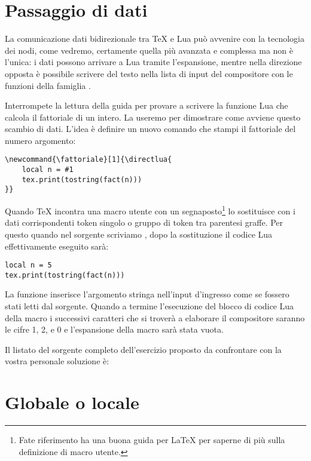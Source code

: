 \section{Passaggio di dati}
\label{secPassaggioDati}

La comunicazione dati bidirezionale tra \TeX{} e Lua può avvenire con la
tecnologia dei nodi, come vedremo, certamente quella più avanzata e complessa
ma non è l'unica: i dati possono arrivare a Lua tramite l'espansione, mentre
nella direzione opposta è possibile scrivere del testo nella lista di input
del compositore con le funzioni della famiglia .

Interrompete la lettura della guida per provare a scrivere la funzione Lua
 che calcola il fattoriale di un intero. La useremo per dimostrare come
avviene questo scambio di dati. L'idea è definire un nuovo comando che stampi il
fattoriale del numero argomento:
\begin{Verbatim}
\newcommand{\fattoriale}[1]{\directlua{
    local n = #1
    tex.print(tostring(fact(n)))
}}
\end{Verbatim}

Quando \TeX{} incontra una macro utente con un segnaposto\footnote{Fate
riferimento ha una buona guida per \LaTeX{} per saperne di più sulla definizione
di macro utente.} lo sostituisce con i dati corrispondenti token singolo o
gruppo di token tra parentesi graffe. Per questo quando nel sorgente scriviamo
, dopo la sostituzione il codice Lua effettivamente
eseguito sarà:
\begin{Verbatim}
local n = 5
tex.print(tostring(fact(n)))
\end{Verbatim}

La funzione  inserisce l'argomento stringa nell'input d'ingresso
come se fossero stati letti dal sorgente. Quando a termine l'esecuzione del
blocco di codice Lua della macro  i successivi caratteri che si
troverà a elaborare il compositore saranno le cifre 1, 2, e 0 e l'espansione
della macro sarà stata vuota.

Il listato del sorgente completo dell'esercizio proposto da confrontare con la
vostra personale soluzione è: 


\section{Globale o locale}
\label{secGlobaleLocale}

